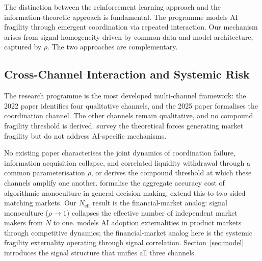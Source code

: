 The distinction between the reinforcement learning approach and the information-theoretic approach is fundamental. The \citet{dou2025a, dou2025b} programme models AI fragility through emergent coordination via repeated interaction. Our mechanism arises from signal homogeneity driven by common data and model architecture, captured by $\rho$. The two approaches are complementary.

\subsection{Cross-Channel Interaction and Systemic Risk}

The \citet{danielsson2022, danielsson2025} research programme is the most developed multi-channel framework: the 2022 paper identifies four qualitative channels, and the 2025 paper formalises the coordination channel. The other channels remain qualitative, and no compound fragility threshold is derived. \citet{goldstein2025} survey the theoretical forces generating market fragility but do not address AI-specific mechanisms.

No existing paper characterises the joint dynamics of coordination failure, information acquisition collapse, and correlated liquidity withdrawal through a common parameterisation $\rho$, or derives the compound threshold at which these channels amplify one another. \citet{kleinberg2021} formalise the aggregate accuracy cost of algorithmic monoculture in general decision-making; \citet{peng2024} extend this to two-sided matching markets. Our $N_{\text{eff}}$ result is the financial-market analog: signal monoculture ($\rho \to 1$) collapses the effective number of independent market makers from $N$ to one. \citet{gans2023} models AI adoption externalities in product markets through competitive dynamics; the financial-market analog here is the systemic fragility externality operating through signal correlation. Section~\ref{sec:model} introduces the signal structure that unifies all three channels.
